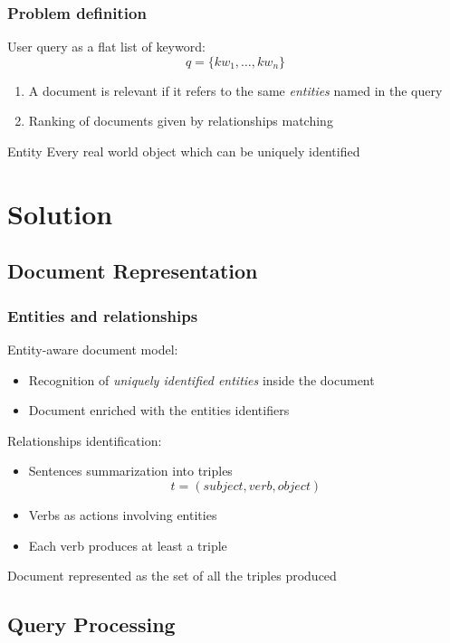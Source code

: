 \documentclass{beamer}
\begin{document}
\begin{frame}
\frametitle{Problem definition}
User query as a flat list of keyword:
$$
q = \{kw_{1}, \dots, kw_{n}\}
$$
\begin{enumerate}
\item A document is relevant if it refers to the same \emph{entities}
  named in the query
\item Ranking of documents given by relationships matching
\end{enumerate}
\bigskip
\begin{exampleblock}{Entity}
Every real world object which can be uniquely identified
\end{exampleblock}
\end{frame}

\section{Solution}
\subsection{Document Representation}

\begin{frame}
\frametitle{Entities and relationships}
Entity-aware document model:
\begin{itemize}
\item Recognition of \emph{uniquely identified entities} inside the
  document
\item Document enriched with the entities identifiers
\end{itemize}
\bigskip
Relationships identification:
\begin{itemize}
\item Sentences summarization into triples
$$
t = (subject, verb, object)
$$
\item Verbs as actions involving entities
\item Each verb produces at least a triple
\end{itemize}
\bigskip
Document represented as the set of all the triples produced
\end{frame}

\subsection{Query Processing}
\end{document}
